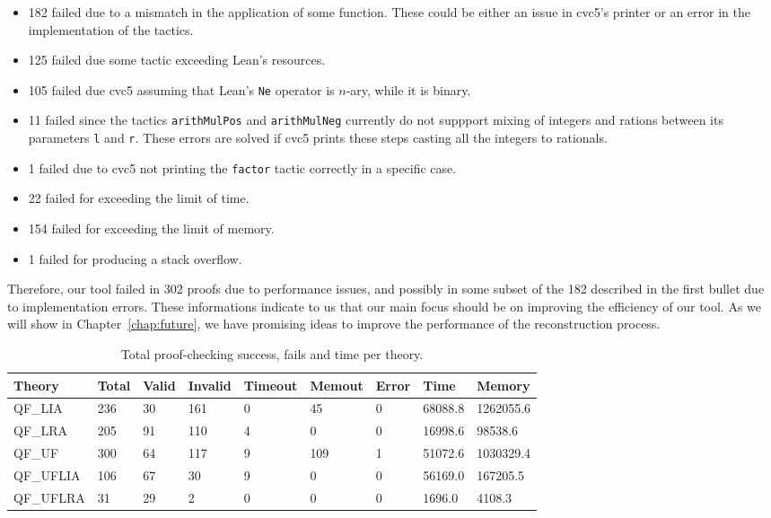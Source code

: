 \begin{itemize}
  \item 182 failed due to a mismatch in the application of some function. These could be either an issue in cvc5's printer or an error in the implementation of the tactics.
  \item 125 failed due some tactic exceeding Lean's resources.
  \item 105 failed due cvc5 assuming that Lean's \texttt{Ne} operator is $n$-ary, while it is binary.
  \item 11 failed since the tactics \texttt{arithMulPos} and \texttt{arithMulNeg} currently do not suppport mixing of integers and rations between its parameters \texttt{l} and \texttt{r}. These errors are solved if cvc5 prints these steps casting all the integers to rationals.
  \item 1 failed due to cvc5 not printing the \texttt{factor} tactic correctly in a specific case.
  \item 22 failed for exceeding the limit of time.
  \item 154 failed for exceeding the limit of memory.
  \item 1 failed for producing a stack overflow.
\end{itemize}

Therefore, our tool failed in 302 proofs due to performance issues, and
possibly in some subset of the 182 described in the first bullet due to
implementation errors. These informations indicate to us that our main
focus should be on improving the efficiency of our tool. As we will
show in Chapter~\ref{chap:future}, we have promising ideas to improve
the performance of the reconstruction process.


\begin{table}[t]
\begin{tabular}{ l l l l l l l l l }
\toprule
Theory & Total & Valid & Invalid & Timeout & Memout & Error  & Time &  Memory \\ \midrule
QF\_LIA & 236 & 30 & 161 & 0 & 45 & 0 & 68088.8 & 1262055.6 \\ \midrule
QF\_LRA & 205 & 91 & 110 & 4 & 0 & 0 & 16998.6 & 98538.6 \\ \midrule
QF\_UF & 300 & 64 & 117 & 9 & 109 & 1 & 51072.6 & 1030329.4 \\ \midrule
QF\_UFLIA & 106 & 67 & 30 & 9 & 0 & 0 & 56169.0 & 167205.5 \\ \midrule
QF\_UFLRA & 31 & 29 & 2 & 0 & 0 & 0 & 1696.0 & 4108.3 \\ \bottomrule
\end{tabular}
\caption{Total proof-checking success, fails and time per theory.}\label{bench}
\end{table}



